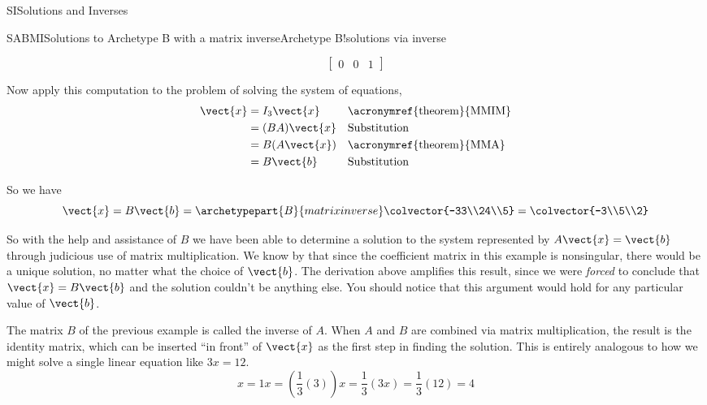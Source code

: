 \begin{subsect}{SI}{Solutions and Inverses}
\begin{example}{SABMI}{Solutions to Archetype B with a matrix inverse}{Archetype B!solutions via inverse}
\begin{para}
\begin{equation*}
\begin{bmatrix}
0 & 0 & 1
\end{bmatrix}
\end{equation*}
\end{para}
%
\begin{para}Now apply this computation to the problem of solving the system of equations,
%
\begin{align*}
\vect{x}
&=I_3\vect{x}&&\text{\acronymref{theorem}{MMIM}}\\
&=(BA)\vect{x}&&\text{Substitution}\\
&=B(A\vect{x})&&\text{\acronymref{theorem}{MMA}}\\
&=B\vect{b}&&\text{Substitution}\\
\end{align*}
\end{para}
%
\begin{para}So we have
%
\begin{equation*}
\vect{x}=B\vect{b}=
\archetypepart{B}{matrixinverse}\colvector{-33\\24\\5}=
\colvector{-3\\5\\2}
\end{equation*}\end{para}
%
\begin{para}So with the help and assistance of $B$ we have been able to determine a solution to the system represented by $A\vect{x}=\vect{b}$ through judicious use of matrix multiplication.  We know by  that since the coefficient matrix in this example is nonsingular, there would be a unique solution, no matter what the choice of $\vect{b}$.  The derivation above amplifies this result, since we were {\em forced} to conclude that $\vect{x}=B\vect{b}$ and the solution couldn't be anything else.  You should notice that this argument would hold for any particular value of $\vect{b}$.\end{para}
%
\end{example}
%
\begin{para}The matrix $B$ of the previous example is called the inverse of $A$.  When $A$ and $B$ are combined via matrix multiplication, the result is the identity matrix, which can be inserted ``in front'' of  $\vect{x}$ as the first step in finding the solution.  This is entirely analogous to how we might solve a single linear equation like $3x=12$.
%
\begin{equation*}
x=1x=\left(\frac{1}{3}\left(3\right)\right)x=\frac{1}{3}\left(3x\right)=\frac{1}{3}\left(12\right)=4

\end{equation*}
\end{para}
\end{subsect}
